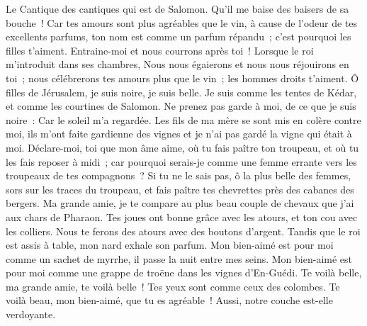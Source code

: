 \begin{multicols}{2}
\VerseOne{}Le Cantique des cantiques qui est de Salomon.
 Qu'il me baise des baisers de sa bouche~!  Car tes amours sont plus agréables que le vin,
à cause de l'odeur de tes excellents parfums, ton nom est comme un parfum répandu~; c'est pourquoi les filles t'aiment.
 Entraine-moi  et nous courrons après toi~!  Lorsque le roi m'introduit dans ses chambres,  Nous nous égaierons et nous nous réjouirons en toi~; nous célébrerons tes amours plus que le vin~; les hommes droits t'aiment.
 Ô filles de Jérusalem, je suis noire, je suis belle. Je suis comme les tentes de Kédar, et comme les courtines de Salomon.
Ne prenez pas garde à moi, de ce que je suis noire~: Car le soleil m'a regardée. Les fils de ma mère se sont mis en colère contre moi, ils m'ont faite gardienne des vignes et je n'ai pas gardé la vigne qui était à moi.
Déclare-moi, toi que mon âme aime, où tu fais paître ton troupeau, et où tu les fais reposer à midi~; car pourquoi serais-je comme une femme errante vers les troupeaux de tes compagnons~?
 Si tu ne le sais pas, ô la plus belle des femmes, sors sur les traces du troupeau, et fais paître tes chevrettes près des cabanes des bergers.
Ma grande amie, je te compare au plus beau couple de chevaux que j'ai aux chars de Pharaon.
Tes joues ont bonne grâce avec les atours, et ton cou avec les colliers.
 Nous te ferons des atours avec des boutons d'argent.
 Tandis que le roi est assis à table, mon nard exhale son parfum.
Mon bien-aimé est pour moi comme un sachet de myrrhe, il passe la nuit entre mes seins.
Mon bien-aimé est pour moi comme une grappe de troëne dans les vignes d'En-Guédi.
 Te voilà belle, ma grande amie, te voilà belle~! Tes yeux sont comme ceux des colombes.
 Te voilà beau, mon bien-aimé, que tu es agréable~! Aussi, notre couche est-elle verdoyante.

\end{multicols}
